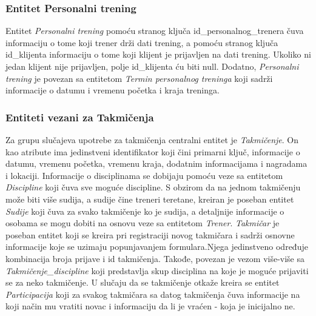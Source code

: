 \documentclass[../main.tex]{subfiles}
\begin{document}
\subsubsection{Entitet Personalni trening}

Entitet \textit{Personalni trening} pomoću stranog ključa id\_personalnog\_trenera  čuva informaciju o tome koji trener drži dati trening, a pomoću stranog ključa id\_klijenta informaciju o tome koji klijent je prijavljen na dati trening. Ukoliko ni jedan klijent nije prijavljen, polje id\_klijenta ću biti null. Dodatno, \textit{Personalni trening} je povezan sa entitetom \textit{Termin personalnog treninga} koji sadrži informacije o datumu i vremenu početka i kraja treninga. 


\subsubsection{Entiteti vezani za Takmičenja}

Za grupu slučajeva upotrebe za takmičenja centralni entitet je \textit{Takmičenje}. On kao atribute ima jedinstveni identifikator koji čini primarni ključ, informacije o datumu, vremenu početka, vremenu kraja, dodatnim informacijama i nagradama i lokaciji. Informacije o disciplinama se dobijaju pomoću veze sa entitetom \textit{Discipline} koji čuva sve moguće discipline. S obzirom da na jednom takmičenju može biti više sudija, a sudije čine treneri teretane, kreiran je poseban entitet \textit{Sudije} koji čuva za svako takmičenje ko je sudija, a detaljnije informacije o osobama se mogu dobiti na osnovu veze sa entitetom \textit{Trener}. \textit{Takmičar} je poseban entitet koji se kreira pri registraciji novog takmičara i sadrži osnovne informacije koje se uzimaju popunjavanjem formulara.Njega jedinstveno određuje kombinacija broja prijave i id takmičenja. Takođe, povezan je vezom više-više sa \textit{Takmičenje\_discipline} koji predstavlja skup disciplina na koje je moguće prijaviti se za neko takmičenje. U slučaju da se takmičenje otkaže kreira se entitet \textit{Participacija} koji za svakog takmičara sa datog takmičenja čuva informacije na koji način mu vratiti novac i informaciju da li je vraćen - koja je inicijalno ne. 
\end{document}
